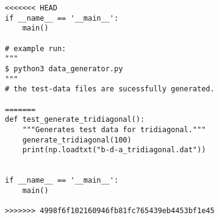 \documentclass[english,notitlepage]{revtex4-1}  %
\begin{document}
\begin{lstlisting}
<<<<<<< HEAD
if __name__ == '__main__':
    main()

# example run:
"""
$ python3 data_generator.py
"""
# the test-data files are sucessfully generated.

=======
def test_generate_tridiagonal():
    """Generates test data for tridiagonal."""
    generate_tridiagonal(100)
    print(np.loadtxt("b-d-a_tridiagonal.dat"))


if __name__ == '__main__':
    main()

>>>>>>> 4998f6f102160946fb81fc765439eb4453bf1e45
\end{lstlisting}

{}
\end{document}
